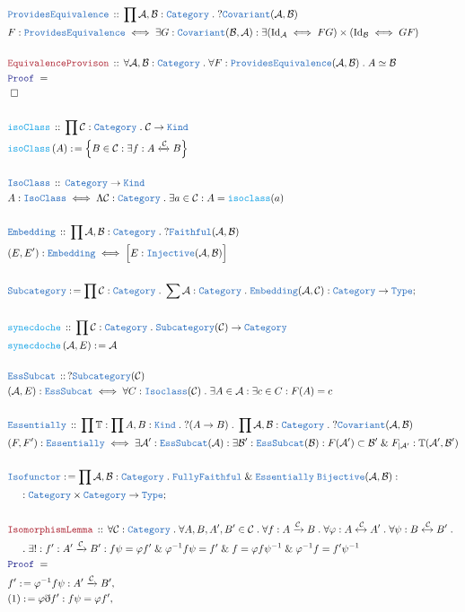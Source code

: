 \documentclass[12pt]{scrartcl}
\newcommand{\TYPE}[1]{\textcolor{NavyBlue}{\mathtt{#1}}}
\newcommand{\FUNC}[1]{\textcolor{Cerulean}{\mathtt{#1}}}
\newcommand{\LOGIC}[1]{\textcolor{Blue}{\mathtt{#1}}}
\newcommand{\THM}[1]{\textcolor{Maroon}{\mathtt{#1}}}
\renewcommand{\.}{\; . \;}
\newcommand{\de}{: \kern 0.1pc =}
\newcommand{\Act}[1]{\left( #1 \right)}
\newcommand{\Theorem}[2]{& \THM{#1} \, :: \, #2 \\ & \Proof = \\ }
\newcommand{\DeclareType}[2]{& \TYPE{#1} \, :: \, #2 \\}
\newcommand{\DefineType}[3]{& #1 : \TYPE{#2} \iff #3 \\}
\newcommand{\DeclareFunc}[2]{& \FUNC{#1} \, :: \, #2 \\}
\newcommand{\DefineFunc}[3]{&  \FUNC{#1}\Act{#2} \de #3 \\}
\newcommand{\NewLine}{\\ & \kern 1pc}
\newcommand{\Page}[1]{ \begin{align*} #1 \end{align*}   }
\newcommand{ \bd }{ \ByDef }
\renewcommand{\And}{\; \& \;}
\newcommand{\Type}{\TYPE{Type}}
\newcommand{\Class}{\TYPE{Kind}}
\newcommand{\Cat}{\TYPE{Category}}
\newcommand{\ToIso}{\xleftrightarrow}
\newcommand{\Arrow}{\xrightarrow}
\newcommand{\Say}[3]{& #1 \de #2 : #3, \\}
\newcommand{\Conclude}[3]{& #1 \de #2 : #3; \\}
\newcommand{\QED}{\; \square}
\newcommand{\EndProof}{& \QED \\}
\newcommand{\ByDef}{\eth}
\newcommand{\Proof}{\LOGIC{Proof} \; }
\newcommand{\Cov}{\TYPE{Covariant}}
\newcommand{\C}{\mathcal{C}}
\newcommand{\A}{\mathcal{A}}
\newcommand{\B}{\mathcal{B}}
\begin{document}
\Page{
	\DeclareType{ProvidesEquivalence}{\prod \A,\B : \Cat \. ? \Cov(\A,\B)}
	\DefineType{F}{ProvidesEquivalence}
	{ 
		\exists G : \Cov(\mathcal{B},\mathcal{A}) :
		\exists  (\mathrm{Id}_{\mathcal{A}} \iff FG) \times (\mathrm{Id}_{\mathcal{B}} \iff GF) 
	}
	\\
	\Theorem{EquivalenceProvison}{\forall \A,\B : \Cat \. \forall F : \TYPE{ProvidesEquivalence}(\A,\B) \. A \simeq \B} 
	\EndProof
	\\
	\DeclareFunc{isoClass}{   \prod \C : \Cat \. \C \to \Class}
	\DefineFunc{isoClass}{A}{\Big\{ B \in \C : \exists f : A \ToIso{\C} B \Big\}}
	\\
	\DeclareType{IsoClass}{ \Cat \to \Class}
	\DefineType{A}{IsoClass}{ \Lambda \C : \Cat \. \exists a \in \C  : A = \FUNC{isoclass}(a)}
	\\
	\DeclareType{Embedding}{\prod \A, \B : \Cat \. ? \TYPE{Faithful}(\A,\B)} 
	\DefineType{(E,E')}{Embedding}{\Big[E : \TYPE{Injective}(\A,\B)\Big]}
	\\
	\Conclude{\TYPE{Subcategory}}{\prod \C : \Cat \. \sum \A : \Cat \. \TYPE{Embedding}(\A,\C)}{ \Cat \to \Type}
	\\
	\DeclareFunc{synecdoche}{ \prod \C : \Cat \. \TYPE{Subcategory}(\C) \to \Cat   }
	\DefineFunc{synecdoche}{ \A,E  }{\A}
	\\
	\DeclareType{EssSubcat}{?\TYPE{Subcategory}(\C)}
	\DefineType{(\A,E)}{EssSubcat}{ \forall C : \TYPE{Isoclass}(\C) \. \exists A \in \A : \exists c \in C : F(A) = c }
	\\
	\DeclareType{Essentially}{  \prod \mathbb{T} : \prod A,B : \Class \. ?(A \to B) \. \prod \A, \B : \Cat \. ?\Cov(\A,\B)}
	\DefineType{ (F,F')  }{  Essentially  }
	{ \exists \A' : \TYPE{EssSubcat}(\A) : \exists \B' : \TYPE{EssSubcat}(\B) : 
		F(\A') \subset \B' \And F_{|\A'} : \mathbb{T}(\A',\B')   } 
       \\
       \Conclude{\TYPE{Isofunctor}}
       {\prod \A,\B : \Cat \. \TYPE{FullyFaithful} \And \TYPE{Essentially} \; \TYPE{Bijective}(\A,\B)  }
       { \NewLine : \Cat \times \Cat \to \Type}
       \\
       \Theorem{ IsomorphismLemma  }{ \forall \C : \Cat \. \forall A,B,A',B' \in \C \. 
		\forall f : A \Arrow{\C} B \.  \forall \varphi : A \ToIso{\C} A' \. 
		\forall \psi : B \ToIso{\C} B' \. 
		\NewLine \.
		\exists! : f' : A' \Arrow{\C} B' :
		f\psi = \varphi f' \And \varphi^{-1}f\psi = f' \And 
		f = \varphi f \psi^{-1} \And \varphi^{-1} f = f'\psi^{-1} 
	}
	\Say{f'}{\varphi^{-1}f \psi}{A' \Arrow{\C} B'}
	\Say{(1)}{\varphi \bd f'}{ f \psi = \varphi f'  }
}
\end{document}
